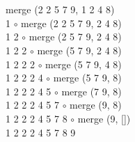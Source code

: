 \documentclass[10pt,a4paper,oneside,ngerman,numbers=noenddot]{scrartcl}
\begin{document}
	\subsection{} %
	\subsection{} %
	\subsection{} %
	\subsection{} %
\section{} %
	\subsection{} %
		merge (2 2 5 7 9, 1 2 4 8)  \\
		1 $\circ$ merge (2 2 5 7 9, 2 4 8) \\
		1 2 $\circ$ merge (2 5 7 9, 2 4 8) \\
		1 2 2 $\circ$ merge (5 7 9, 2 4 8) \\
		1 2 2 2 $\circ$ merge (5 7 9, 4 8) \\
		1 2 2 2 4 $\circ$ merge (5 7 9, 8) \\
		1 2 2 2 4 5 $\circ$ merge (7 9, 8) \\
		1 2 2 2 4 5 7 $\circ$ merge (9, 8) \\
		1 2 2 2 4 5 7 8 $\circ$ merge (9, []) \\
		1 2 2 2 4 5 7 8 9  
\end{document}
